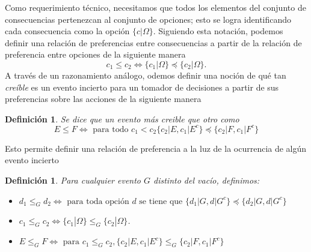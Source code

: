 \documentclass[11pt]{article}
\theoremstyle{plain}
\newtheorem{defi}[teo]{Definición}
\begin{document}
Como requerimiento técnico, necesitamos que todos los elementos del conjunto de consecuencias pertenezcan al conjunto de opciones; esto se logra identificando cada consecuencia como la opción $\{c|\Omega \}$. Siguiendo esta notación, podemos definir una relación de preferencias entre consecuencias a partir de la relación de preferencia entre opciones de la siguiente manera
\[ c_1 \leq c_2 \Leftrightarrow \{ c_1 | \Omega \} \preceq \{ c_2 | \Omega \}.\]
A través de un razonamiento análogo, odemos definir una noción de qué tan \textit{creíble} es un evento incierto para un tomador de decisiones a partir de sus preferencias sobre las acciones de la siguiente manera
\begin{defi}
Se dice que un evento más creible que otro como
\[E \leq F \Leftrightarrow \textrm{ para todo } c_1 < c_2 \{ c_2 | E, c_1 | E^c \} \preceq \{ c_2 | F, c_1 | F^c \} \]
\end{defi}
Esto permite definir una relación de preferencia a la luz de la ocurrencia de algún evento incierto
\begin{defi}
Para cualquier evento $G$ distinto del vacío, definimos:
\begin{itemize}
\item $d_1 \leq_G d_2 \Leftrightarrow \textrm{ para toda opción } d \textrm{ se tiene que } \{d_1 | G, d | G^c \} \preceq \{ d_2 | G, d | G^c\}$
\item $c_1 \leq_G c_2 \Leftrightarrow \{ c_1 | \Omega \} \leq_G \{ c_2 | \Omega \}$.
\item $E \leq_G F \Leftrightarrow \textrm{ para } c_1 \leq_G c_2, \{ c_2 | E, c_1 | E^c \} \leq_G \{ c_2 | F, c_1 | F^c \} $
\end{itemize}
\end{defi} 
\end{document}
